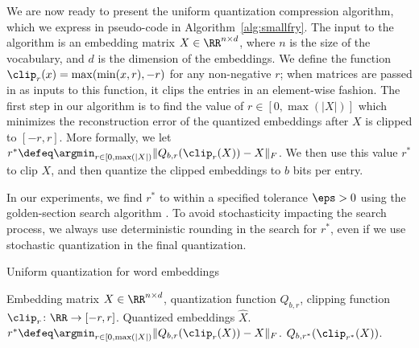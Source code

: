 We are now ready to present the uniform quantization compression algorithm, which we express in pseudo-code in Algorithm~\ref{alg:smallfry}.
The input to the algorithm is an embedding matrix $X \in \RR^{n\times d}$, where $n$ is the size of the vocabulary, and $d$ is the dimension of the embeddings.
We define the function $\clip_r(x) = \max(\min(x,r),-r)$ for any non-negative $r$; when matrices are passed in as inputs to this function, it clips the entries in an element-wise fashion.
The first step in our algorithm is to find the value of $r \in [0,\max(|X|)]$ which minimizes the reconstruction error of the quantized embeddings after $X$ is clipped to $[-r,r]$.
More formally, we let $r^* \defeq \argmin_{r \in [0,\max(|X|)} \|Q_{b,r}(\clip_r(X))-X\|_F$.
We then use this value $r^*$ to clip $X$, and then quantize the clipped embeddings to $b$ bits per entry.

In our experiments, we find $r^*$ to within a specified tolerance $\eps > 0$ using the golden-section search algorithm \citep{golden53}.
To avoid stochasticity impacting the search process, we always use deterministic rounding in the search for $r^*$, even if we use stochastic quantization in the final quantization.

\begin{algorithm}[tb]
   \caption{Uniform quantization for word embeddings}
   \label{alg:smallfry}
\begin{algorithmic}[1]
	  Embedding matrix $X \in \RR^{n \times d}$, quantization function $Q_{b,r}$, clipping function $\clip_r\colon\RR\rightarrow[-r,r]$.
	 Quantized embeddings $\hat{X}$.
	\STATE $r^* \defeq \argmin_{r \in [0,\max(|X|)} \|Q_{b,r}(\clip_r(X))-X\|_F$.
	 $Q_{b,r^*}(\clip_{r^*}(X))$.
\end{algorithmic}
\end{algorithm}


